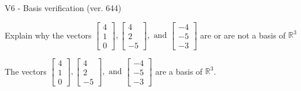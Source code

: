 \begin{exercise}
  \begin{exerciseTitle}V6 - Basis verification (ver. 644)\end{exerciseTitle}
  \begin{exerciseStatement}
    Explain why the vectors \(\left[\begin{array}{r}
4 \\
1 \\
0
\end{array}\right] , \left[\begin{array}{r}
4 \\
2 \\
-5
\end{array}\right] , \text{ and } \left[\begin{array}{r}
-4 \\
-5 \\
-3
\end{array}\right]\) are or are not a basis of \(\mathbb{R}^3\)	


  \end{exerciseStatement}
  \begin{exerciseAnswer}
   The vectors \(\left[\begin{array}{r}
4 \\
1 \\
0
\end{array}\right] , \left[\begin{array}{r}
4 \\
2 \\
-5
\end{array}\right] , \text{ and } \left[\begin{array}{r}
-4 \\
-5 \\
-3
\end{array}\right]\) 
  	 are  a basis of \(\mathbb{R}^3\).
  


  \end{exerciseAnswer}
\end{exercise}